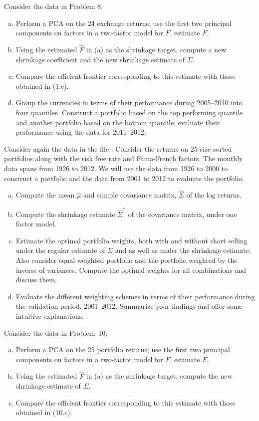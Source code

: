 \prob Consider the data in Problem 8.
	\begin{enumerate}[(a)]
	\item Perform a PCA on the 24 exchange returns; use the first two principal components on factors in a two-factor model for $F$, estimate $F$.
	\item Using the estimated $\hat{F}$ in (a) as the shrinkage target, compute a new shrinkage coefficient and the new shrinkage estimate of $\Sigma$. 
	\item Compare the efficient frontier corresponding to this estimate with those obtained in (1.c). 
	\item Group the currencies in terms of their performance during 2005--2010 into four quantiles. Construct a portfolio based on the top performing quantile and another portfolio based on the bottom quantile; evaluate their performance using the data for 2011--2012. \twomedskip
	\end{enumerate}


\prob Consider again the data in the file . Consider the returns on 25 size sorted portfolios along with the risk free rate and Fama-French factors. The monthly data spans from 1926 to 2012. We will use the data from 1926 to 2000 to construct a portfolio and the data from 2001 to 2012 to evaluate the portfolio. 
	\begin{enumerate}[(a)]
	\item Compute the mean $\hat{\mu}$ and sample covariance matrix, $\hat{\Sigma}$ of the log returns.
	\item Compute the shrinkage estimate $\hat{\Sigma}^*$ of the covariance matrix, under one factor model.
	\item Estimate the optimal portfolio weights, both with and without short selling under the regular estimate of $\Sigma$ and as well as under the shrinkage estimate. Also consider equal weighted portfolio and the portfolio weighted by the inverse of variances. Compute the optimal weights for all combinations and discuss them.
	\item Evaluate the different weighting schemes in terms of their performance during the validation period, 2001--2012. Summarize your findings and offer some intuitive explanations. \twomedskip
	\end{enumerate}


\prob Consider the data in Problem~10.
	\begin{enumerate}[(a)]
	\item Perform a PCA on the 25 portfolio returns; use the first two principal components on factors in a two-factor model for $F$, estimate $F$.
	\item Using the estimated $\hat{F}$ in (a) as the shrinkage target, compute the new shrinkage estimate of $\Sigma$.
	\item Compare the efficient frontier corresponding to this estimate with those obtained in (10.c). \twomedskip
	\end{enumerate}